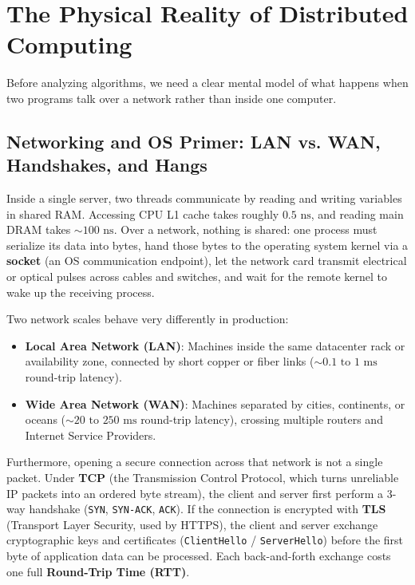 \section{The Physical Reality of Distributed Computing}

Before analyzing algorithms, we need a clear mental model of what happens when two programs talk over a network rather than inside one computer.

\subsection{Networking and OS Primer: LAN vs. WAN, Handshakes, and Hangs}

Inside a single server, two threads communicate by reading and writing variables in shared RAM. Accessing CPU L1 cache takes roughly $0.5\text{ ns}$, and reading main DRAM takes $\sim 100\text{ ns}$. Over a network, nothing is shared: one process must serialize its data into bytes, hand those bytes to the operating system kernel via a \textbf{socket} (an OS communication endpoint), let the network card transmit electrical or optical pulses across cables and switches, and wait for the remote kernel to wake up the receiving process.

Two network scales behave very differently in production:
\begin{itemize}[leftmargin=18pt]
  \item \textbf{Local Area Network (LAN)}: Machines inside the same datacenter rack or availability zone, connected by short copper or fiber links ($\sim 0.1\text{ to }1\text{ ms}$ round-trip latency).
  \item \textbf{Wide Area Network (WAN)}: Machines separated by cities, continents, or oceans ($\sim 20\text{ to }250\text{ ms}$ round-trip latency), crossing multiple routers and Internet Service Providers.
\end{itemize}

Furthermore, opening a secure connection across that network is not a single packet. Under \textbf{TCP} (the Transmission Control Protocol, which turns unreliable IP packets into an ordered byte stream), the client and server first perform a 3-way handshake (\texttt{SYN}, \texttt{SYN-ACK}, \texttt{ACK}). If the connection is encrypted with \textbf{TLS} (Transport Layer Security, used by HTTPS), the client and server exchange cryptographic keys and certificates (\texttt{ClientHello} / \texttt{ServerHello}) before the first byte of application data can be processed. Each back-and-forth exchange costs one full \textbf{Round-Trip Time (RTT)}.

